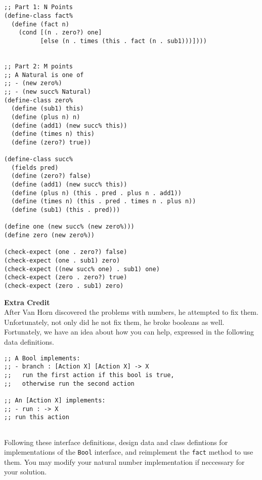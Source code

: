 \documentclass[12pt]{article}                   %
\newenvironment{solution}{}{}
\begin{document}
\begin{solution}
\begin{verbatim}


;; Part 1: N Points
(define-class fact%
  (define (fact n)
    (cond [(n . zero?) one]
          [else (n . times (this . fact (n . sub1)))])))


;; Part 2: M points
;; A Natural is one of
;; - (new zero%)
;; - (new succ% Natural)
(define-class zero%
  (define (sub1) this)
  (define (plus n) n)
  (define (add1) (new succ% this))
  (define (times n) this)
  (define (zero?) true))

(define-class succ%
  (fields pred)
  (define (zero?) false)
  (define (add1) (new succ% this))
  (define (plus n) (this . pred . plus n . add1))
  (define (times n) (this . pred . times n . plus n))
  (define (sub1) (this . pred)))

(define one (new succ% (new zero%)))
(define zero (new zero%))

(check-expect (one . zero?) false)
(check-expect (one . sub1) zero)
(check-expect ((new succ% one) . sub1) one)
(check-expect (zero . zero?) true)
(check-expect (zero . sub1) zero)
\end{verbatim}
\newpage
\end{solution}

\begin{problem}

\textbf{Extra Credit}
\\
\noindent
After Van Horn discovered the problems with numbers, he attempted to
fix them.  Unfortunately, not only did he not fix them, he broke
booleans as well.  Fortunately, we have an idea about how you can
help, expressed in the following data definitions.  

\begin{verbatim}
;; A Bool implements:
;; - branch : [Action X] [Action X] -> X
;;   run the first action if this bool is true, 
;;   otherwise run the second action

;; An [Action X] implements:
;; - run : -> X
;; run this action


\end{verbatim}

Following these interface definitions, design data and class
defintions for implementations of the \verb|Bool| interface, and
reimplement the \verb|fact| method to use them.
You may modify your natural number implementation if neccessary for
your solution.

\ifrubric\else
{}
\fi


\ifrubric\else
{}
\fi
\end{problem}
\end{document}
